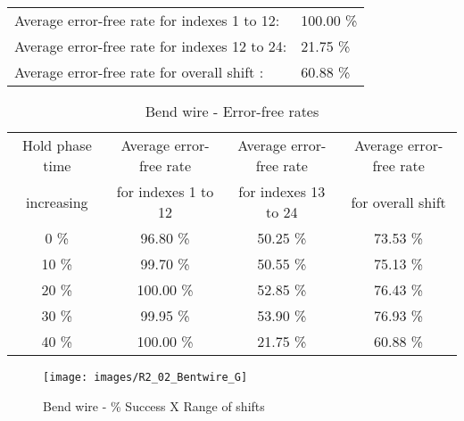 \begin{table}[h]
\begin{center}
\begin{tabular}{|c|c|c|c|c|}
\end{tabular}


\flushleft
\begin{tabular}{l l}
Average error-free rate for indexes  1 to 12: & 100.00 \% \\
Average error-free rate for indexes 12 to 24: &  21.75 \% \\
Average error-free rate for overall shift   : &  60.88 \% \\

\end{tabular}


\end{center}
\end{table}



\begin{table}[h]
\begin{center}
\caption{Bend wire - Error-free rates}
\begin{tabular}{|c|c|c|c|}
\hline
Hold phase time   & Average error-free rate  & Average error-free rate  & Average error-free rate  \\
increasing & for indexes  1 to 12 & for indexes 13 to 24 & for overall shift \\
\hline
0  \% &  96.80 \% & 50.25 \% & 73.53 \% \\
\hline
10 \% &  99.70 \% & 50.55 \% & 75.13 \% \\
\hline
20 \% & 100.00 \% & 52.85 \% & 76.43 \% \\
\hline
30 \% & 99.95 \% & 53.90 \% & 76.93 \% \\
\hline
40 \% & 100.00 \% & 21.75 \% & 60.88 \% \\
\hline


\end{tabular}

\end{center}
\end{table}


\pagebreak
\begin{figure}[h!]
\center
\texttt{[image: images/R2\_02\_Bentwire\_G]}
\caption{Bend wire -  \% Success X Range of shifts}
\label{figure:Bentwire_reg_gt1}
\end{figure}

